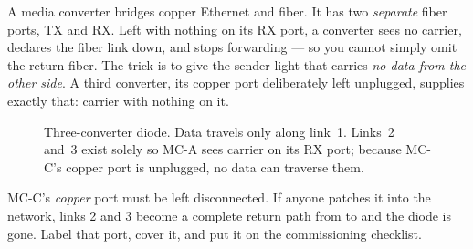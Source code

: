\documentclass[11pt,a4paper]{article}
\begin{document}
A media converter bridges copper Ethernet and fiber. It has two \emph{separate}
fiber ports, TX and RX. Left with nothing on its RX port, a converter sees no
carrier, declares the fiber link down, and stops forwarding --- so you cannot
simply omit the return fiber. The trick is to give the sender light that
carries \emph{no data from the other side}. A third converter, its copper port
deliberately left unplugged, supplies exactly that: carrier with nothing on it.

\begin{figure}[h]
\centering
{}
\caption{Three-converter diode. Data travels only along link~1. Links~2 and~3
         exist solely so MC-A sees carrier on its RX port; because MC-C's
         copper port is unplugged, no data can traverse them.}
\label{fig:triangle}
\end{figure}

\begin{warnbox}
MC-C's \emph{copper} port must be left disconnected. If anyone patches it into
the \srcside{} network, links 2 and 3 become a complete return path from
\dstside{} to \srcside{} and the diode is gone. Label that port, cover it, and
put it on the commissioning checklist.
\end{warnbox}
\end{document}
